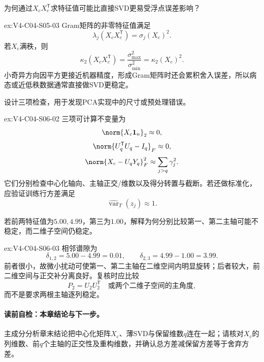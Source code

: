 \begin{SLChapterExercisePairSection}
\begin{exercise}\label{ex:V4-C04-S05-03}
为何通过$X_cX_c^{\mathsf T}$求特征值可能比直接SVD更易受浮点误差影响？
\end{exercise}
\ifSLFullEdition
{}\label{sol:V4-C04-S05-03}
\begin{chapterexercisesolution}{ex:V4-C04-S05-03}
Gram矩阵的非零特征值满足
\[
\lambda_j(X_cX_c^{\mathsf T})=\sigma_j(X_c)^2.
\]
若$X_c$满秩，则
\[
\kappa_2(X_cX_c^{\mathsf T})
=\frac{\sigma_{\max}^2}{\sigma_{\min}^2}
=\kappa_2(X_c)^2.
\]
小奇异方向因平方更接近机器精度，形成Gram矩阵时还会累积舍入误差，所以病态或近低秩数据通常直接做SVD更稳定。
\end{chapterexercisesolution}
\fi

\begin{exercise}\label{ex:V4-C04-S06-02}
设计三项检查，用于发现PCA实现中的尺寸或预处理错误。
\end{exercise}
\ifSLFullEdition
{}\label{sol:V4-C04-S06-02}
\begin{chapterexercisesolution}{ex:V4-C04-S06-02}
三项可计算不变量为
\[
\norm{X_c\mathbf1_n}_2\approx 0,
\]
\[
\norm{U_q^{\mathsf T}U_q-I_q}_F\approx 0,
\]
\[
\norm{X_c-U_qY_q}_F^2
\approx \sum_{j>q}\gamma_j^2.
\]
它们分别检查中心化轴向、主轴正交/维数以及得分转置与截断。若还做标准化，应验证训练行方差满足
\[
\widehat{\operatorname{var}}_T(z_j)\approx 1.
\]
\end{chapterexercisesolution}
\fi

\begin{exercise}\label{ex:V4-C04-S06-03}
若前两特征值为$5.00,4.99$，第三为$1.00$，解释为何分别比较第一、第二主轴可能不稳定，而二维子空间仍稳定。
\end{exercise}
\ifSLFullEdition
{}\label{sol:V4-C04-S06-03}
\begin{chapterexercisesolution}{ex:V4-C04-S06-03}
相邻谱隙为
\[
\delta_{1,2}=5.00-4.99=0.01,
\qquad
\delta_{2,3}=4.99-1.00=3.99.
\]
前者很小，故微小扰动可使第一、第二主轴在二维空间内明显旋转；后者较大，前二维空间与正交补分离良好。复核时应比较
\[
P_2=U_2U_2^{\mathsf T}
\quad\text{或两个二维子空间的主角度},
\]
而不是要求两根主轴逐列稳定。
\end{chapterexercisesolution}
\fi

\end{SLChapterExercisePairSection}

\paragraph{读前自检：本章结论与下一步。}主成分分析章末结论把中心化矩阵$X_c$、薄SVD与保留维数$q$连在一起；请核对$X_c$的列维数、前$q$个主轴的正交性及重构维数，并确认总方差减保留方差等于舍弃方差。\par

